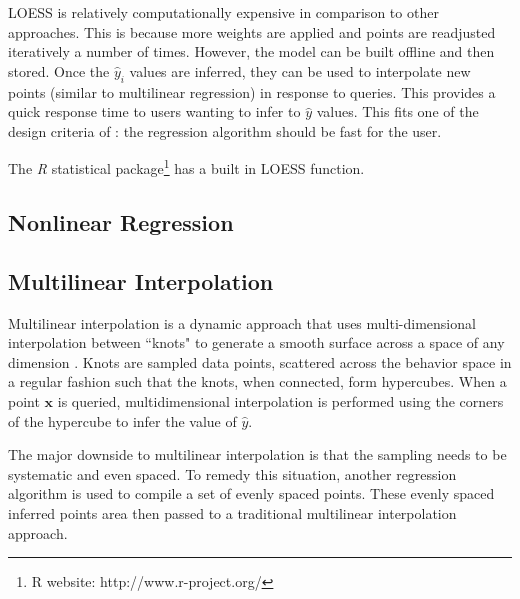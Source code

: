 LOESS is relatively computationally expensive in comparison to other approaches.
This is because more weights are applied and points are readjusted iteratively a number of times.
However, the model can be built offline and then stored.
Once the $\hat y_i$ values are inferred, they can be used to interpolate new points (similar to multilinear regression) in response to queries.
This provides a quick response time to users wanting to infer to $\hat y$ values.
This fits one of the design criteria of \fw: the regression algorithm should be fast for the user.

The \textit{R} statistical package\footnote{R website: http://www.r-project.org/} has a built in LOESS function.

\subsection{Nonlinear Regression}
\cite{gallant1975nonlinear}

\subsection{Multilinear Interpolation}

Multilinear interpolation is a dynamic approach that uses multi-dimensional interpolation between ``knots" to generate a smooth surface across a space of any dimension \cite{davies1997multidimensional}.
Knots are sampled data points, scattered across the behavior space in a regular fashion such that the knots, when connected, form hypercubes.
When a point $\mathbf x$ is queried, multidimensional interpolation is performed using the corners of the hypercube to infer the value of $\hat y$.

The major downside to multilinear interpolation is that the sampling needs to be systematic and even spaced.
To remedy this situation, another regression algorithm is used to compile a set of evenly spaced points.
These evenly spaced inferred points area then passed to a traditional multilinear interpolation approach.

